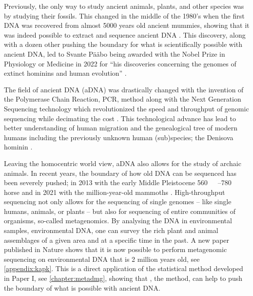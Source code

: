 
Previously, the only way to study ancient animals, plants, and other species was by studying their fossils. This changed in the middle of the 1980's when the first DNA was recovered from almost 5000 years old ancient mummies, showing that it was indeed possible to extract and sequence ancient DNA \autocite{paaboMolecularCloningAncient1985,paaboPreservationDNAAncient1985}. This discovery, along with a dozen other pushing the boundary for what is scientifically possible with ancient DNA, led to Svante Pääbo being awarded with the Nobel Prize in Physiology or Medicine in 2022 for ``his discoveries concerning the genomes of extinct hominins and human evolution'' \autocite{thenobelassemblyatkarolinskainstitutetNobelPrizePhysiology2022}.

The field of ancient DNA (aDNA) was drastically changed with the invention of the Polymerase Chain Reaction, PCR, method \autocite{mullisSpecificEnzymaticAmplification1986} along with the Next Generation Sequencing technology which revolutionized the speed and throughput of genomic sequencing while decimating the cost \autocite{slatkoOverviewNextGeneration2018}. This technological advance has lead to better understanding of human migration and the genealogical tree of modern humans including the previously unknown human (sub)species; the Denisova hominin \autocite{krauseCompleteMitochondrialDNA2010}.

Leaving the homocentric world view, aDNA also allows for the study of archaic animals. In recent years, the boundary of how old DNA can be sequenced has been severely pushed; in 2013 with the early Middle Pleistocene \qtyrange[range-phrase = --,range-units = single]{560}{780}{\kilo\year\BP} horse \autocite{orlandoRecalibratingEquusEvolution2013} and in 2021 with the million-year-old mammoths \autocite{vandervalkMillionyearoldDNASheds2021}. High-throughput sequencing not only allows for the sequencing of single genomes -- like single humans, animals, or plants -- but also for sequencing of entire communities of organisms, so-called metagenomics. By analysing the DNA in environmental samples, environmental DNA, one can survey the rich plant and animal assemblages of a given area and at a specific time in the past. A new paper published in Nature shows that it is now possible to perform metagenomic sequencing on environmental DNA that is 2 million years old, see \autoref{appendix:kapk}. This is a direct application of the statistical method developed in Paper I, see \autoref{chapter:metadmg}, showing that \metaDMG, the method, can help to push the boundary of what is possible with ancient DNA.

